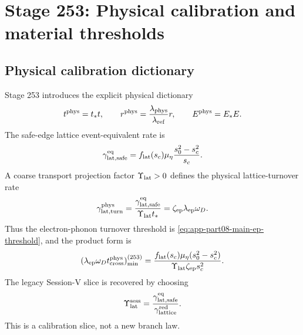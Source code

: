 \section[Stage 253]{Stage 253: Physical calibration and material thresholds}
\label{stage:253}


\subsection{Physical calibration dictionary}
\label{subsec:app-part08-stage253-calibration}

Stage 253 introduces the explicit physical dictionary
\begin{equation}
\label{eq:app-part08-stage253-physical-dictionary}
t^{\rm phys}=t_*t,
\qquad
r^{\rm phys}=\frac{\lambda_{\rm phys}}{\lambda_{\rm ref}}r,
\qquad
E^{\rm phys}=E_*E.
\end{equation}
The safe-edge lattice event-equivalent rate is
\begin{equation}
\label{eq:app-part08-stage253-lat-safe-rate}
\gamma_{\rm lat,safe}^{\rm eq}
=
f_{\rm lat}(s_c)\mu_\eta\frac{s_0^2-s_c^2}{s_c}.
\end{equation}
A coarse transport projection factor \(\Upsilon_{\rm lat}>0\) defines the physical lattice-turnover rate
\begin{equation}
\label{eq:app-part08-stage253-lattice-turn-rate}
\gamma_{\rm lat,turn}^{\rm phys}
=
\frac{\gamma_{\rm lat,safe}^{\rm eq}}{\Upsilon_{\rm lat}t_*}
=
\zeta_{\rm ep}\lambda_{\rm ep}\omega_D.
\end{equation}
Thus the electron-phonon turnover threshold is \cref{eq:app-part08-main-ep-threshold}, and the product form is
\begin{equation}
\label{eq:app-part08-stage253-ep-product}
(\lambda_{\rm ep}\omega_Dt_{\rm cross}^{\rm phys})_{\min}^{(253)}
=
\frac{f_{\rm lat}(s_c)\mu_\eta(s_0^2-s_c^2)}{\Upsilon_{\rm lat}\zeta_{\rm ep}s_c^2}.
\end{equation}
The legacy Session-V slice is recovered by choosing
\begin{equation}
\label{eq:app-part08-stage253-upsilon-session}
\Upsilon_{\rm lat}^{\rm sess}
=
\frac{\gamma_{\rm lat,safe}^{\rm eq}}{\gamma_{\rm lattice}^{\rm red}}.
\end{equation}
This is a calibration slice, not a new branch law.


